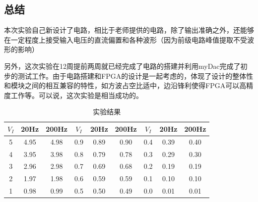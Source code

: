\documentclass[UTF8,a4paper,landscape,16pt]{paper}
\begin{document}
\begin{multicols}{4}
\section{总结}\small
\noindent 本次实验自己新设计了电路，相比于老师提供的电路，除了输出准确之外，还能够在一定程度上接受输入电压的直流偏置和各种波形（因为前级电路峰值提取不受波形的影响）

\noindent 另外，这次实验在12周提前两周就已经完成了电路的搭建并利用myDac完成了初步的测试工作。由于电路搭建和FPGA的设计是一起考虑的，体现了设计的整体性和模块之间的相互兼容的特性，如方波占空比适中，边沿锋利使得FPGA可以高精度工作等。可以说，这次实验是相当成功的。
\begin{table}[H]
\centering
\caption{实验结果}
\label{t1}
\begin{sideways}
\begin{tabular}{|c|c|c|c|c|c|c|c|c|}
\hline
$V_{I}$ & 20Hz & 200Hz&$V_{I}$ & 20Hz & 200Hz&$V_{I}$ & 20Hz & 200Hz\\ \hline
5 & 4.95 & 4.98 & 0.9 & 0.89 & 0.90 &0.4 & 0.39 & 0.40\\ \hline
4 & 3.95 & 3.98 & 0.8 & 0.79 & 0.78 &0.3 & 0.29 & 0.30\\ \hline
3 & 2.96 & 2.98 & 0.7 & 0.69 & 0.68 & 0.2 & 0.19 & 0.19 \\ \hline
2 & 1.97 & 1.98 & 0.6 & 0.59 & 0.59 & 0.1 & 0.10 & 0.10\\ \hline
1 & 0.98 & 0.99 & 0.5 & 0.50 & 0.49 &0.0 & 0.01 & 0.01\\ \hline
\end{tabular}
%
\end{sideways}
\end{table}
\end{multicols}
\end{document}
